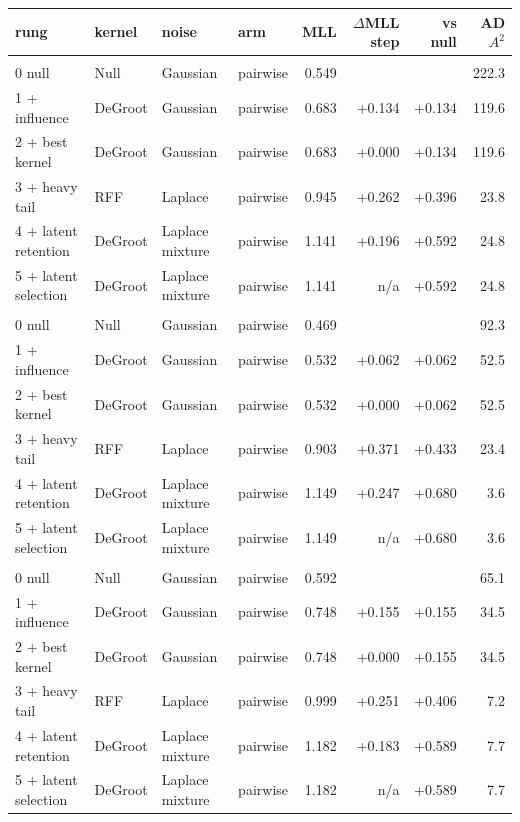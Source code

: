 \begin{longtable}{llllrrrr}
\toprule
rung & kernel & noise & arm & MLL & $\Delta$MLL step & vs null & AD $A^2$ \\
\midrule
\endhead
\multicolumn{8}{l}{\adams{}} \\
0 null & Null & Gaussian & pairwise & 0.549 &  &  & 222.3 \\
1 + influence & DeGroot & Gaussian & pairwise & 0.683 & +0.134 & +0.134 & 119.6 \\
2 + best kernel & DeGroot & Gaussian & pairwise & 0.683 & +0.000 & +0.134 & 119.6 \\
3 + heavy tail & RFF & Laplace & pairwise & 0.945 & +0.262 & +0.396 & 23.8 \\
4 + latent retention & DeGroot & Laplace mixture & pairwise & 1.141 & +0.196 & +0.592 & 24.8 \\
5 + latent selection & DeGroot & Laplace mixture & pairwise & 1.141 & n/a & +0.592 & 24.8 \\
\midrule
\multicolumn{8}{l}{\adamsLo{}} \\
0 null & Null & Gaussian & pairwise & 0.469 &  &  & 92.3 \\
1 + influence & DeGroot & Gaussian & pairwise & 0.532 & +0.062 & +0.062 & 52.5 \\
2 + best kernel & DeGroot & Gaussian & pairwise & 0.532 & +0.000 & +0.062 & 52.5 \\
3 + heavy tail & RFF & Laplace & pairwise & 0.903 & +0.371 & +0.433 & 23.4 \\
4 + latent retention & DeGroot & Laplace mixture & pairwise & 1.149 & +0.247 & +0.680 & 3.6 \\
5 + latent selection & DeGroot & Laplace mixture & pairwise & 1.149 & n/a & +0.680 & 3.6 \\
\midrule
\multicolumn{8}{l}{\adamsMid{}} \\
0 null & Null & Gaussian & pairwise & 0.592 &  &  & 65.1 \\
1 + influence & DeGroot & Gaussian & pairwise & 0.748 & +0.155 & +0.155 & 34.5 \\
2 + best kernel & DeGroot & Gaussian & pairwise & 0.748 & +0.000 & +0.155 & 34.5 \\
3 + heavy tail & RFF & Laplace & pairwise & 0.999 & +0.251 & +0.406 & 7.2 \\
4 + latent retention & DeGroot & Laplace mixture & pairwise & 1.182 & +0.183 & +0.589 & 7.7 \\
5 + latent selection & DeGroot & Laplace mixture & pairwise & 1.182 & n/a & +0.589 & 7.7 \\

\end{longtable}
